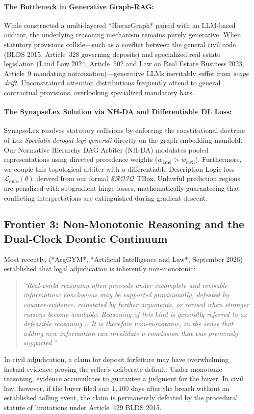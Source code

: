 \documentclass[11pt,a4paper]{article}
\begin{document}
\paragraph{The Bottleneck in Generative Graph-RAG:} While \citet{chen2026legalgraphrag} constructed a multi-layered *HierarGraph* paired with an LLM-based auditor, the underlying reasoning mechanism remains purely generative. When statutory provisions collide---such as a conflict between the general civil code (BLDS 2015, Article~328 governing deposits) and specialized real estate legislation (Land Law 2024, Article~502 and Law on Real Estate Business 2023, Article~9 mandating notarization)---generative LLMs inevitably suffer from \textit{scope drift}. Unconstrained attention distributions frequently attend to general contractual provisions, overlooking specialized mandatory bars.

\paragraph{The SynapseLex Solution via NH-DA and Differentiable DL Loss:} SynapseLex resolves statutory collisions by enforcing the constitutional doctrine of \textit{Lex Specialis derogat legi generali} directly on the graph embedding manifold. Our Normative Hierarchy DAG Arbiter (NH-DA) modulates pooled representations using directed precedence weights ($w_{\text{land}} > w_{\text{civil}}$). Furthermore, we couple this topological arbiter with a differentiable Description Logic loss $\mathcal{L}_{\text{onto}}(\theta)$ derived from our formal $\mathcal{SROIQ}$ TBox. Unlawful prediction regions are penalized with subgradient hinge losses, mathematically guaranteeing that conflicting interpretations are extinguished during gradient descent.

\subsection{Frontier 3: Non-Monotonic Reasoning and the Dual-Clock Deontic Continuum}
Most recently, \citet{deveci2026arggym} (*ArgGYM*, *Artificial Intelligence and Law*, September 2026) established that legal adjudication is inherently non-monotonic:
\begin{quote}
\textit{``Real-world reasoning often proceeds under incomplete and revisable information: conclusions may be supported provisionally, defeated by counter-evidence, reinstated by further arguments, or revised when stronger reasons become available. Reasoning of this kind is generally referred to as defeasible reasoning... It is therefore non-monotonic, in the sense that adding new information can invalidate a conclusion that was previously supported.''} \citep[p.~1]{deveci2026arggym}
\end{quote}
In civil adjudication, a claim for deposit forfeiture may have overwhelming factual evidence proving the seller's deliberate default. Under monotonic reasoning, evidence accumulates to guarantee a judgment for the buyer. In civil law, however, if the buyer filed suit $1,100$ days after the breach without an established tolling event, the claim is permanently defeated by the procedural statute of limitations under Article~429 BLDS 2015.
\end{document}
